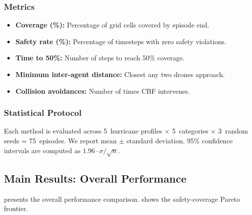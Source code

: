 \documentclass[12pt,a4paper,twocolumn]{article}
\begin{document}
\subsubsection{Metrics}
\begin{itemize}[leftmargin=*]
    \item \textbf{Coverage (\%):} Percentage of grid cells covered by episode end.
    \item \textbf{Safety rate (\%):} Percentage of timesteps with zero safety violations.
    \item \textbf{Time to 50\%:} Number of steps to reach 50\% coverage.
    \item \textbf{Minimum inter-agent distance:} Closest any two drones approach.
    \item \textbf{Collision avoidances:} Number of times CBF intervenes.
\end{itemize}

\subsubsection{Statistical Protocol}
Each method is evaluated across 5~hurricane profiles $\times$ 5~categories $\times$ 3~random seeds = 75~episodes. We report mean $\pm$ standard deviation. 95\% confidence intervals are computed as $1.96 \cdot \sigma / \sqrt{n}$.

\subsection{Main Results: Overall Performance}
\label{sec:main_results}

 presents the overall performance comparison.  shows the safety-coverage Pareto frontier.
\end{document}
